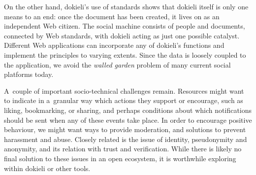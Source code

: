 \documentclass[a4paper]{llncs}
\begin{document}
                            
\par 
                                On the other hand, dokieli’s use of standards
                                shows that dokieli itself is only one means to an end:
                                once the document has been created,
                                it lives on as an independent Web citizen.
                                The social machine consists of people and documents,
                                connected by Web standards,
                                with dokieli acting as just one possible catalyst.
                                Different Web applications can incorporate any of dokieli’s functions
                                and implement the principles to varying extents.
                                Since the data is loosely coupled to the application,
                                we avoid the \textit{walled garden} problem
                                of many current social platforms today.
                            
                            
\par 
                                A couple of important socio-technical challenges remain.
                                Resources might want to indicate in a granular way
                                which actions they support or encourage,
                                such as liking, bookmarking, or sharing,
                                and perhaps conditions about which notifications should be sent
                                when any of these events take place.
                                In order to encourage positive behaviour,
                                we might want ways to provide moderation,
                                and solutions to prevent harassment and abuse.
                                Closely related is the issue of identity, pseudonymity and anonymity,
                                and its relation with trust and verification.
                                While there is likely no final solution to these issues in an open ecosystem,
                                it is worthwhile exploring within dokieli or other tools.
                            
\end{document}
